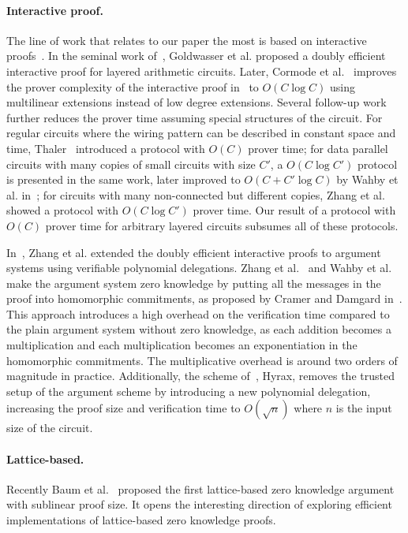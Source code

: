 \paragraph{Interactive proof.} The line of work that relates to our paper the most is based on interactive proofs~\cite{goldwasser1989knowledge}. In the seminal work of~\cite{GKR}, Goldwasser et al. proposed a doubly efficient interactive proof for layered arithmetic circuits. Later, Cormode et al.~\cite{CMT} improves the prover complexity of the interactive proof in~\cite{GKR} to $O(C\log C)$ using multilinear extensions instead of low degree extensions. Several follow-up work further reduces the prover time assuming special structures of the circuit. For regular circuits where the wiring pattern can be described in constant space and time, Thaler~\cite{t13} introduced a protocol with $O(C)$ prover time; for data parallel circuits with many copies of small circuits with size $C'$, a $O(C\log C')$ protocol is presented in the same work, later improved to $O(C+C'\log C)$ by Wahby et al. in~\cite{wahby2017full}; for circuits with many non-connected but different copies, Zhang et al. showed a protocol with $O(C\log C')$ prover time. Our result of a protocol with $O(C)$ prover time for arbitrary layered circuits subsumes all of these protocols. 

In~\cite{zhang2017vsql}, Zhang et al. extended the doubly efficient interactive proofs to argument systems using verifiable polynomial delegations. Zhang et al.~\cite{vram} and Wahby et al.~\cite{hyrax} make the argument system zero knowledge by putting all the messages in the proof into homomorphic commitments, as proposed by Cramer and Damgard in~\cite{cramer1998zero}. This approach introduces a high overhead on the verification time compared to the plain argument system without zero knowledge, as each addition becomes a multiplication and each multiplication becomes an exponentiation in the homomorphic commitments. The multiplicative overhead is around two orders of magnitude in practice. Additionally, the scheme of~\cite{hyrax}, Hyrax, removes the trusted setup of the argument scheme by introducing a new polynomial delegation, increasing the proof size and verification time to $O(\sqrt{n})$ where $n$ is the input size of the circuit. 

\paragraph{Lattice-based.} Recently Baum et al.~\cite{baum2018sub} proposed the first lattice-based zero knowledge argument with sublinear proof size. It opens the interesting direction of exploring efficient implementations of lattice-based zero knowledge proofs.